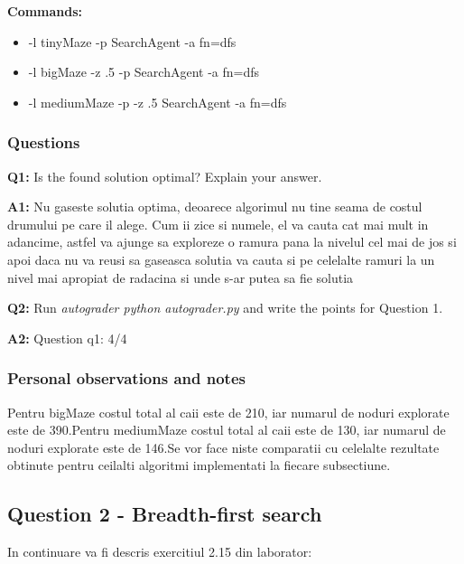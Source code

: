 \textbf{Commands:}
\begin{itemize}
    \setlength\itemsep{0em}
    \item  -l tinyMaze -p SearchAgent -a fn=dfs 
    \item  -l bigMaze -z .5 -p  SearchAgent -a fn=dfs 
    \item  -l mediumMaze -p -z .5  SearchAgent -a fn=dfs
        
\end{itemize}

\subsubsection{Questions}



\textbf{Q1:} Is the found solution optimal? Explain your answer.


\textbf{A1:} Nu gaseste solutia optima, deoarece algorimul nu tine seama de costul drumului pe care il alege. Cum ii zice si numele, el va cauta cat mai mult in adancime, astfel va ajunge sa exploreze o ramura pana la nivelul cel mai de jos si apoi daca nu va reusi sa gaseasca solutia va cauta si pe celelalte ramuri  la un nivel mai apropiat de radacina si unde s-ar putea sa fie solutia \newline


\textbf{Q2:} Run\textit{ autograder python autograder.py} and write the points for Question 1.


\textbf{A2:} Question q1: 4/4


\subsubsection{Personal observations and notes}
Pentru bigMaze costul total al caii este de 210, iar numarul de noduri explorate este de 390.Pentru mediumMaze costul total al caii este de 130, iar numarul de noduri explorate este de 146.Se vor face niste comparatii cu celelalte rezultate obtinute pentru ceilalti algoritmi implementati la fiecare subsectiune. 
\vspace{0.75cm}

\subsection{Question 2 - Breadth-first search}
In continuare va fi descris exercitiul 2.15 din laborator:\newline


